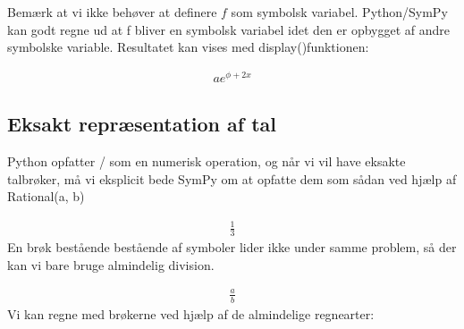 \documentclass[letterpaper,10pt,english]{jupyterBook}
\begin{document}
\begin{sphinxVerbatim}[commandchars=\\\{\}]
      
\end{sphinxVerbatim}

Bemærk at vi ikke behøver at definere \(f\) som symbolsk variabel. Python/SymPy kan godt regne ud at f bliver en symbolsk variabel idet den er opbygget af andre symbolske variable. Resultatet kan vises med display()\sphinxhyphen{}funktionen:

\begin{sphinxVerbatim}[commandchars=\\\{\}]
\end{sphinxVerbatim}
\begin{equation*}
\begin{split}\displaystyle a e^{\phi + 2 x}\end{split}
\end{equation*}

\subsection{Eksakt repræsentation af tal}
\label{\detokenize{notebooks/sympy/Notebook2:eksakt-repraesentation-af-tal}}
Python opfatter / som en numerisk operation, og når vi vil have eksakte tal\sphinxhyphen{}brøker, må vi eksplicit bede SymPy om at opfatte dem som sådan ved hjælp af Rational(a, b)

\begin{sphinxVerbatim}[commandchars=\\\{\}]
   
\end{sphinxVerbatim}
\begin{equation*}
\begin{split}\displaystyle \frac{1}{3}\end{split}
\end{equation*}
En brøk bestående bestående af symboler lider ikke under samme problem, så der kan vi bare bruge almindelig division.

\begin{sphinxVerbatim}[commandchars=\\\{\}]
  
\end{sphinxVerbatim}
\begin{equation*}
\begin{split}\displaystyle \frac{a}{b}\end{split}
\end{equation*}
Vi kan regne med brøkerne ved hjælp af de almindelige regnearter:
\end{document}
